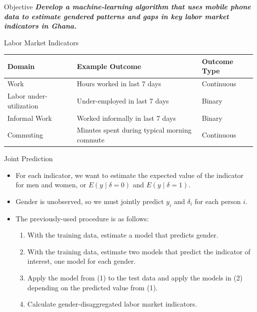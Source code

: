 \documentclass{beamer}
\begin{document}
\begin{frame}{Objective}
\textbf{\emph{Develop a machine-learning algorithm that uses mobile phone data to estimate gendered 
patterns and gaps in key labor market indicators in Ghana.}}
\end{frame}

\begin{frame}{Labor Market Indicators}
\footnotesize
\begin{center}
\begin{tabular}{p{3.2cm} p{3.5cm} p{2.5cm}} 
\hline
Domain & Example Outcome & Outcome Type \\ \hline
Work & Hours worked in last 7 days & Continuous \\ 
Labor under-utilization & Under-employed in last 7 days & Binary \\ 
Informal Work & Worked informally in last 7 days & Binary \\ 
Commuting & Minutes spent during typical morning commute & Continuous \\ \hline
\end{tabular}
\end{center}
\end{frame}

\begin{frame}{Joint Prediction}
\begin{itemize}
\item For each indicator, we want to estimate the expected value of the indicator for men and 
women, or $E(y \mid \delta = 0)$ and $E(y \mid \delta = 1)$.
\item Gender is unobserved, so we must jointly predict $y_i$ and $\delta_i$ for each person $i$.
\item The previously-used procedure is as follows:
\begin{enumerate}
\item With the training data, estimate a model that predicts gender.
\item With the training data, estimate two models that predict the indicator of interest, one model 
for each gender.
\item Apply the model from (1) to the test data and apply the models in (2) depending on the 
predicted value from (1).
\item Calculate gender-disaggregated labor market indicators.
\end{enumerate}
\end{itemize}
\end{frame}
\end{document}
